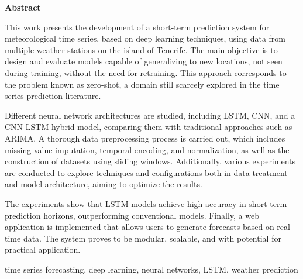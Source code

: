 \documentclass[spanish,a4paper,12pt,oneside]{extreport}
\newenvironment{summary}
{\par\noindent\begin{center}\textbf{Abstract}\end{center}\begin{itshape}\par\noindent}
{\end{itshape}}
\newenvironment{keywords}
{\begin{list}{}{\setlength{\leftmargin}{1em}}\item[\hskip\labelsep \bfseries Keywords:]}
{\end{list}}
\begin{document}
\begin{summary}
{
This work presents the development of a short-term prediction system for meteorological time series, based on deep learning techniques, using data from multiple weather stations on the island of Tenerife. The main objective is to design and evaluate models capable of generalizing to new locations, not seen during training, without the need for retraining. This approach corresponds to the problem known as zero-shot, a domain still scarcely explored in the time series prediction literature.

Different neural network architectures are studied, including LSTM, CNN, and a CNN-LSTM hybrid model, comparing them with traditional approaches such as ARIMA. A thorough data preprocessing process is carried out, which includes missing value imputation, temporal encoding, and normalization, as well as the construction of datasets using sliding windows. Additionally, various experiments are conducted to explore techniques and configurations both in data treatment and model architecture, aiming to optimize the results.

The experiments show that LSTM models achieve high accuracy in short-term prediction horizons, outperforming conventional models. Finally, a web application is implemented that allows users to generate forecasts based on real-time data. The system proves to be modular, scalable, and with potential for practical application.
}

\em
\begin {keywords}
time series forecasting, deep learning, neural networks, LSTM, weather prediction
\end {keywords}

\end{summary}
\newpage{\pagestyle{empty}}
\thispagestyle{empty}

\pagestyle{myheadings} %



\renewcommand{\thepage}{\roman{page}}
\setcounter{page}{1}
\pagestyle{plain} 
\end{document}
